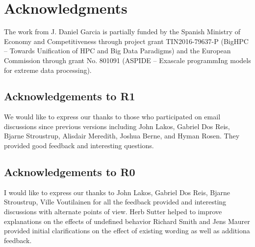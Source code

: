 \section*{Acknowledgments}

The work from J. Daniel Garcia is partially funded by
the Spanish Ministry of Economy and Competitiveness through project grant
TIN2016-79637-P (BigHPC -- Towards Unification of HPC and Big Data Paradigms)
and the European Commission through grant
No. 801091 (ASPIDE -- Exascale programmIng models for extreme data processing).

\subsection*{Acknowledgements to R1}

We would like to express our thanks to those who participated on email discussions
since previous versions including John Lakos, Gabriel Dos Reis, Bjarne Stroustrup,
Alisdair Meredith, Joshua Berne, and Hyman Rosen. They provided good feedback and
interesting questions.

\subsection*{Acknowledgements to R0}

I would like to express our thanks to John Lakos, Gabriel Dos Reis, Bjarne
Stroustrup, Ville Voutilainen for all the feedback provided and interesting
discussions with alternate points of view.
Herb Sutter helped to improve explanations on the effects of undefined behavior
Richard Smith and Jens Maurer provided initial clarifications on the effect of
existing wording as well as additiona feedback.

